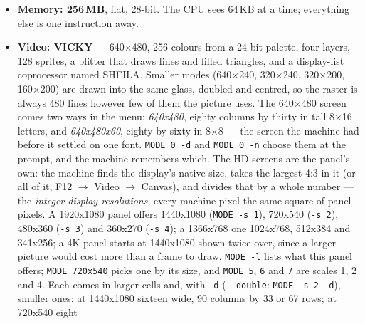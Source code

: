 \begin{itemize}[leftmargin=1.4em]
  The clock is whatever the host it runs on can hold at sixty frames a
  second with no gaps in the sound. It is a setting (F12,
  under Machine --- six steps from 60\,MHz down to 10; the ladder goes on
  to 202.5, and those faster steps are held back for now). A host nobody
  has measured runs at 40.5, the MEGA65's number; \verb|SETUP| measures
  it properly, with the sound and the picture really running, and the
  machine keeps the answer for that host so later boots pay nothing. It
  never second-guesses a clock you chose yourself. A desktop of the last
  ten years holds a hundred megahertz or more. \verb|INFO| reports the
  clock in force, read live, and \verb|BENCH| is there when you want the
  whole picture.
\item \textbf{Memory: 256\,MB}, flat, 28-bit. The CPU sees 64\,KB at a time;
  everything else is one instruction away.
\item \textbf{Video: VICKY} --- 640$\times$480, 256 colours from a 24-bit
  palette, four layers, 128 sprites, a blitter that draws lines and filled
  triangles, and a display-list coprocessor named SHEILA. Smaller modes
  (640$\times$240, 320$\times$240, 320$\times$200, 160$\times$200) are
  drawn into the same glass, doubled and centred, so the raster is always
  480 lines however few of them the picture uses. The 640$\times$480
  screen comes two ways in the menu: \emph{640x480}, eighty columns by
  thirty in tall 8$\times$16 letters, and \emph{640x480x60}, eighty by
  sixty in 8$\times$8 --- the screen the machine had before it settled on
  one font. \verb|MODE 0 -d| and \verb|MODE 0 -n| choose them at the
  prompt, and the machine remembers which. The HD screens are the
  panel's own: the machine finds the display's native size, takes the
  largest 4:3 in it (or all of it, F12 $\rightarrow$ Video $\rightarrow$
  Canvas), and divides that by a whole number --- the \emph{integer display
  resolutions}, every machine pixel the same square of panel pixels. A
  1920x1080 panel offers 1440x1080 (\verb|MODE -s 1|), 720x540
  (\verb|-s 2|), 480x360 (\verb|-s 3|) and 360x270 (\verb|-s 4|); a 1366x768 one 1024x768,
  512x384 and 341x256; a 4K panel starts at 1440x1080 shown twice over, since
  a larger picture would cost more than a frame to draw. \verb|MODE -l|
  lists what this panel offers; \verb|MODE 720x540| picks one by its size, and
  \verb|MODE 5|, \verb|6| and \verb|7| are scales 1, 2 and 4. Each comes in
  larger cells and, with \verb|-d| (\verb|--double|: \verb|MODE -s 2 -d|),
  smaller ones: at
  1440x1080 sixteen wide, 90 columns by 33 or 67 rows; at 720x540 eight

\end{itemize}
